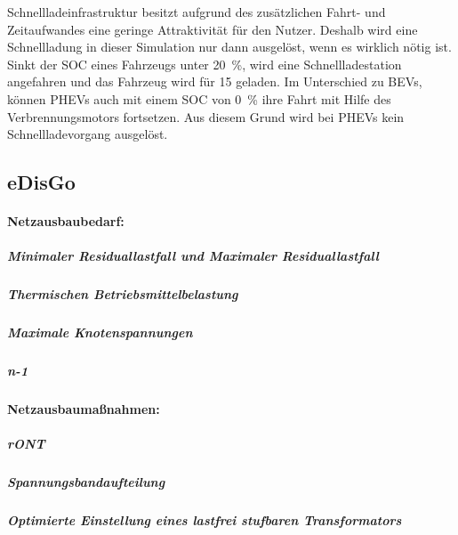 

Schnellladeinfrastruktur besitzt aufgrund des zusätzlichen Fahrt- und Zeitaufwandes eine geringe Attraktivität für den Nutzer.
Deshalb wird eine Schnellladung in dieser Simulation nur dann ausgelöst, wenn es wirklich nötig ist.
Sinkt der \gls{SOC} eines Fahrzeugs unter \SI{20}{\percent}, wird eine Schnellladestation angefahren und das Fahrzeug wird für \SI{15}{\Minuten} geladen.
Im Unterschied zu \glspl{BEV}, können \glspl{PHEV} auch mit einem \gls{SOC} von \SI{0}{\percent} ihre Fahrt mit Hilfe des Verbrennungsmotors fortsetzen.
Aus diesem Grund wird bei \glspl{PHEV} kein Schnellladevorgang ausgelöst.


\subsection{eDisGo}\label{chap:edisgo_theo}

\paragraph{Netzausbaubedarf:}


\subparagraph{Minimaler Residuallastfall und Maximaler Residuallastfall}

\subparagraph{Thermischen Betriebsmittelbelastung}

\subparagraph{Maximale Knotenspannungen}


\subparagraph{n-1}

\paragraph{Netzausbaumaßnahmen:}


\subparagraph{rONT}



\subparagraph{Spannungsbandaufteilung}

\subparagraph{Optimierte Einstellung eines lastfrei stufbaren Transformators}